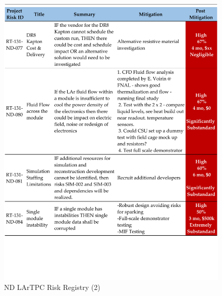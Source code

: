 \begin{figure}
\centering 
\includegraphics[width=1\linewidth]{graphics/lartpc/lartpcrisk2.pdf}
\caption{\label{fig:lartpcrisk2} ND LArTPC Risk Registry (2)}
\end{figure}

